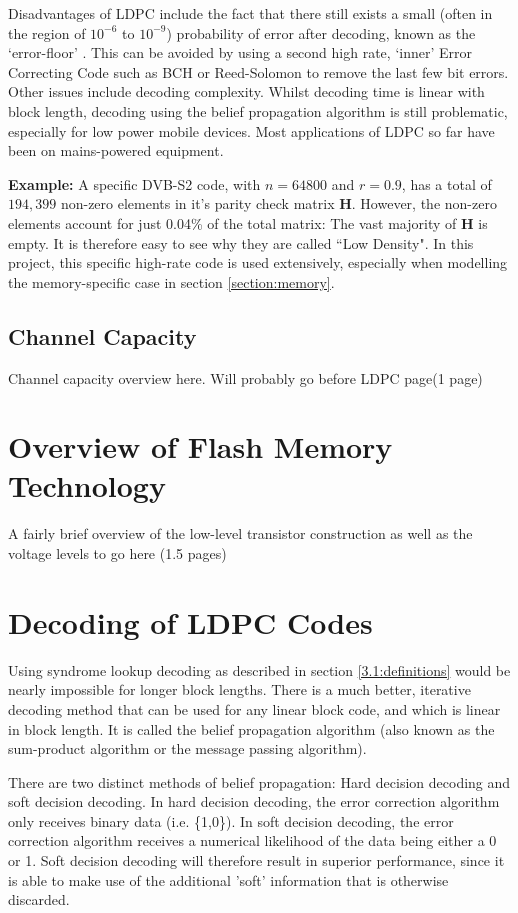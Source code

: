 \documentclass[11pt]{article}
\numberwithin{equation}{subsection}
\begin{document}
Disadvantages of LDPC include the fact that there still exists a small (often in the region of $10^{-6}$ to $10^{-9}$) probability of error after decoding, known as the `error-floor' \cite{richardson2003error}. This can be avoided by using a second high rate, `inner' Error Correcting Code such as BCH or Reed-Solomon to remove the last few bit errors. Other issues include decoding complexity. Whilst decoding time is linear with block length, decoding using the belief propagation algorithm is still problematic, especially for low power mobile devices. Most applications of LDPC so far have been on mains-powered equipment.


\textbf{Example:}
A specific DVB-S2 code, with $n = 64800$ and $r = 0.9$, has a total of $194,399$ non-zero elements in it's parity check matrix $\mathbf{H}$. However, the non-zero elements account for just 0.04\% of the total matrix: The vast majority of $\mathbf{H}$ is empty. It is therefore easy to see why they are called ``Low Density". In this project, this specific high-rate code is used extensively, especially when modelling the memory-specific case in section \ref{section:memory}.

\subsection{Channel Capacity}

Channel capacity overview here. Will probably go before LDPC page(1 page)

\section{Overview of Flash Memory Technology} \label{section:memtech}
A fairly brief overview of the low-level transistor construction as well as the voltage levels to go here (1.5 pages)

\section{Decoding of LDPC Codes} \label{decoding}
Using syndrome lookup decoding as described in section \ref{3.1:definitions} would be nearly impossible for longer block lengths. There is a much better, iterative decoding method that can be used for any linear block code, and which is linear in block length. It is called the belief propagation algorithm (also known as the sum-product algorithm or the message passing algorithm). 

There are two distinct methods of belief propagation: Hard decision decoding and soft decision decoding. In hard decision decoding, the error correction algorithm only receives binary data (i.e. \{1,0\}). In soft decision decoding, the error correction algorithm receives a numerical likelihood of the data being either a 0 or 1. Soft decision decoding will therefore result in superior performance, since it is able to make use of the additional 'soft' information that is otherwise discarded.
\end{document}

